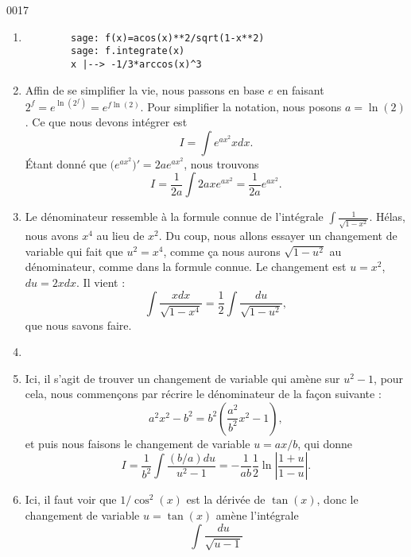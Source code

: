 \begin{corrige}{0017}
\begin{enumerate}
\item
	\begin{verbatim}
		sage: f(x)=acos(x)**2/sqrt(1-x**2)
		sage: f.integrate(x)              
		x |--> -1/3*arccos(x)^3
	\end{verbatim}
\item
Affin de se simplifier la vie, nous passons en base $e$ en faisant $2^f= e^{\ln(2^f)}= e^{f\ln(2)}$. Pour simplifier la notation, nous posons $a=\ln(2)$. Ce que nous devons intégrer est
\begin{equation}	
	I=\int e^{ax^2}xdx.
\end{equation}
Étant donné que $\big(  e^{ax^2} \big)'=2a e^{ax^2}$, nous trouvons
\begin{equation}
	I=\frac{ 1 }{ 2a }\int2ax e^{ax^2}=\frac{1}{ 2a } e^{ax^2}.
\end{equation}

\item
Le dénominateur ressemble à la formule connue de l'intégrale $\int\frac{1}{ \sqrt{1-x^2} }$. Hélas, nous avons $x^4$ au lieu de $x^2$. Du coup, nous allons essayer un changement de variable qui fait que $u^2=x^4$, comme ça nous aurons $\sqrt{1-u^2}$ au dénominateur, comme dans la formule connue. Le changement est $u=x^2$, $du=2xdx$. Il vient :
\begin{equation}
	\int\frac{ xdx }{ \sqrt{1-x^4} }=\frac{ 1 }{2}\int\frac{ du }{ \sqrt{1-u^2} },
\end{equation}
que nous savons faire.

\item
\item
Ici, il s'agit de trouver un changement de variable qui amène sur $u^2-1$, pour cela, nous commençons par récrire le dénominateur de la façon suivante :
\begin{equation}
	a^2x^2-b^2=b^2(\frac{ a^2 }{ b^2 }x^2-1),
\end{equation}
et puis nous faisons le changement de variable $u=ax/b$, qui donne
\begin{equation}
	I=\frac{1}{ b^2 }\int\frac{ (b/a)du }{ u^2-1 }=-\frac{1}{ ab }\frac{ 1 }{2}\ln\left| \frac{ 1+u }{ 1-u } \right| .
\end{equation}

\item
Ici, il faut voir que $1/\cos^2(x)$ est la dérivée de $\tan(x)$, donc le changement de variable $u=\tan(x)$ amène l'intégrale
\begin{equation}
	\int\frac{ du }{ \sqrt{u-1} }
\end{equation}


\end{enumerate}
\end{corrige}
